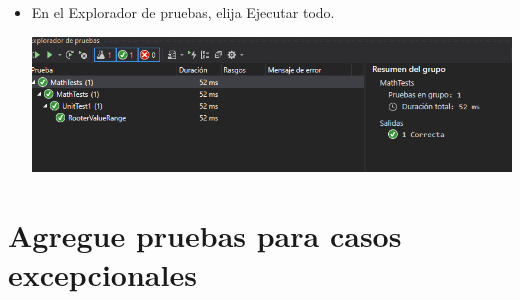 \begin{itemize}
\begin{center}
\end{center}
\item En el Explorador de pruebas, elija Ejecutar todo.
\begin{center}
\includegraphics[width=\columnwidth]{images/12}\newline
\end{center}
\end{itemize}
\section{Agregue pruebas para casos excepcionales} 

